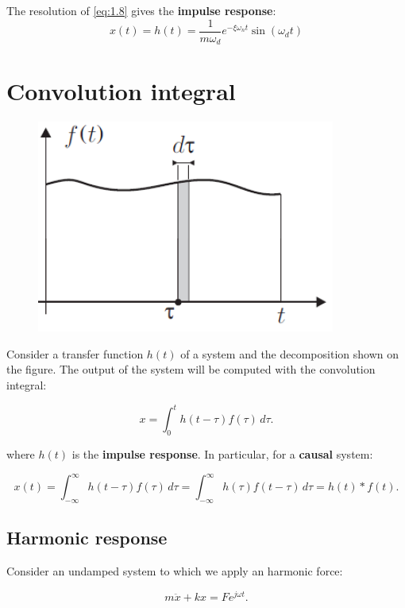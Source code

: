 				The resolution of \eqref{eq:1.8} gives the \textbf{impulse response}:
				\begin{equation}
				x(t) = h(t) = \frac{1}{m\omega _d} e^{- \xi\omega _n t} \sin (\omega _d t)
\end{equation}				 

	\section{Convolution integral}
		\begin{figure}
		\vspace{-5mm}
		\includegraphics[scale=0.4]{ch1/8}
		\end{figure}
		Consider a transfer function $h(t)$ of a system and the decomposition shown on the figure. The output of the system will be computed with the convolution integral:
		
		\begin{equation}
		x = \int _0^t h(t-\tau)f(\tau) \, d\tau.
		\end{equation}
		
		where $h(t)$ is the \textbf{impulse response}. In particular, for a \textbf{causal} system:
		
		\begin{equation}
		x(t) = \int _{-\infty}^{\infty} h(t-\tau)f(\tau)\, d\tau = \int _{-\infty}^{\infty} h(\tau)f(t-\tau)\, d\tau = h(t)*f(t).
				\label{eq:1.13}
		\end{equation}	
		
		\subsection{Harmonic response}
			Consider an undamped system	to which we apply an harmonic force:
			
			\begin{equation}
			m \ddot{x} + kx = F e^{j\omega t}.
			\end{equation}
			
